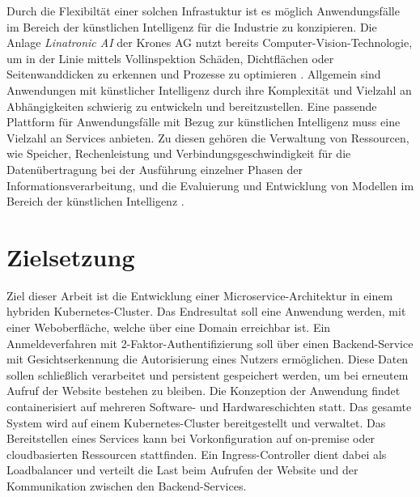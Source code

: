 Durch die Flexibiltät einer solchen Infrastuktur ist es möglich Anwendungsfälle im Bereich
der künstlichen Intelligenz
für die Industrie zu konzipieren. Die Anlage \textit{Linatronic AI} der Krones AG nutzt bereits Computer-Vision-Technologie,
um in der Linie mittels Vollinspektion Schäden, Dichtflächen oder Seitenwanddicken
zu erkennen und Prozesse zu optimieren \cite{linatronic}. Allgemein sind Anwendungen mit künstlicher Intelligenz durch ihre Komplexität
und Vielzahl an Abhängigkeiten schwierig zu entwickeln und bereitzustellen. 
Eine passende Plattform für Anwendungsfälle mit Bezug zur künstlichen Intelligenz
muss eine Vielzahl an Services anbieten. Zu diesen gehören die Verwaltung von Ressourcen, wie Speicher,
Rechenleistung und Verbindungsgeschwindigkeit
für die Datenübertragung bei der Ausführung einzelner Phasen der Informationsverarbeitung, und die Evaluierung und Entwicklung von Modellen
im Bereich der künstlichen Intelligenz \cite{mlops}. 

\section{Zielsetzung}
Ziel dieser Arbeit ist die Entwicklung einer Microservice-Architektur in einem hybriden Kubernetes-Cluster. 
Das Endresultat soll eine Anwendung werden, mit einer Weboberfläche, welche über eine Domain erreichbar ist.
Ein Anmeldeverfahren mit 2-Faktor-Authentifizierung soll über einen Backend-Service mit Gesichtserkennung die Autorisierung eines Nutzers ermöglichen.
Diese Daten sollen schließlich verarbeitet und persistent 
gespeichert werden, um bei erneutem Aufruf der Website bestehen zu bleiben.
Die Konzeption der Anwendung findet containerisiert auf mehreren Software- und Hardwareschichten
statt. 
Das gesamte System wird auf einem Kubernetes-Cluster bereitgestellt und verwaltet.
Das Bereitstellen eines Services kann bei Vorkonfiguration auf on-premise oder cloudbasierten Ressourcen stattfinden.
Ein Ingress-Controller dient dabei als Loadbalancer und verteilt die Last beim 
Aufrufen der Website und der Kommunikation zwischen den Backend-Services.

